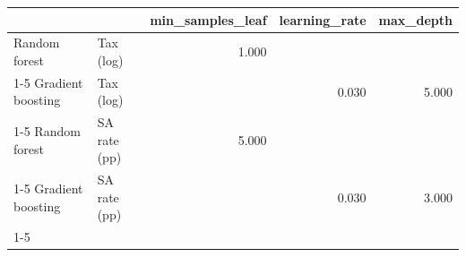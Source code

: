 \begin{tabular}{llrrr}
\toprule
 &  & min\_samples\_leaf & learning\_rate & max\_depth \\
\midrule
Random forest & Tax (log) & 1.000 &  &  \\
\cline{1-5}
Gradient boosting & Tax (log) &  & 0.030 & 5.000 \\
\cline{1-5}
Random forest & SA rate (pp) & 5.000 &  &  \\
\cline{1-5}
Gradient boosting & SA rate (pp) &  & 0.030 & 3.000 \\
\cline{1-5}
\bottomrule
\end{tabular}
